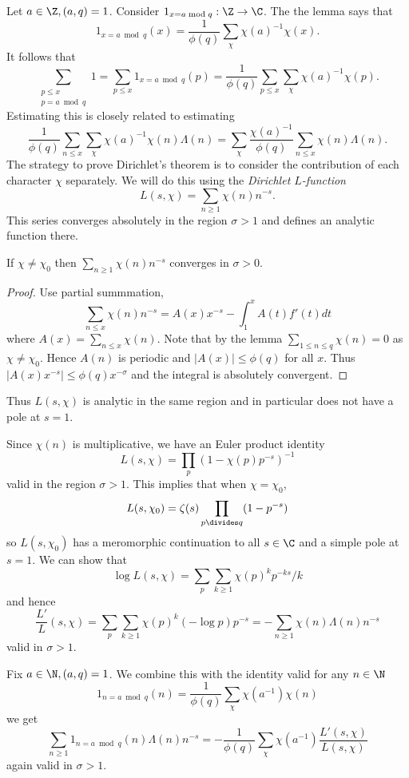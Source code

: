 \documentclass[a4paper]{article}
\theoremstyle{definition}
\begin{document}
Let \(a \in \Z, (a, q) = 1\). Consider \(1_{x = a \bmod q}: \Z \to \C\). The the lemma says that
\[
  1_{x = a \bmod q} (x) = \frac{1}{\phi(q)} \sum_\chi \chi(a)^{-1} \chi(x).
\]
It follows that
\[
  \sum_{\substack{p \leq x \\ p = a \bmod q}} 1
  = \sum_{p \leq x} 1_{x = a \bmod q}(p)
  = \frac{1}{\phi(q)} \sum_{p \leq x} \sum_\chi \chi(a)^{-1} \chi(p).
\]
Estimating this is closely related to estimating 
\[
  \frac{1}{\phi(q)} \sum_{n \leq x} \sum_\chi \chi(a)^{-1} \chi(n) \Lambda(n)
  = \sum_\chi \frac{\chi(a)^{-1}}{\phi(q)} \sum_{n \leq x} \chi(n) \Lambda(n).
\]
The strategy to prove Dirichlet's theorem is to consider the contribution of each character \(\chi\) separately. We will do this using the \emph{Dirichlet \(L\)-function}
\[
  L(s, \chi) = \sum_{n \geq 1} \chi(n) n^{-s}.
\]
This series converges absolutely in the region \(\sigma > 1\) and defines an analytic function there.

\begin{lemma}
  If \(\chi \neq \chi_0\) then \(\sum_{n \geq 1} \chi(n) n^{-s}\) converges in \(\sigma > 0\).
\end{lemma}

\begin{proof}
  Use partial summmation,
  \[
    \sum_{n \leq x} \chi(n) n^{-s} = A(x) x^{-s} - \int_1^x A(t) f'(t) dt
  \]
  where \(A(x) = \sum_{n \leq x} \chi(n)\). Note that by the lemma \(\sum_{1 \leq n \leq q} \chi(n) = 0\) as \(\chi \neq \chi_0\). Hence \(A(n)\) is periodic and \(|A(x)| \leq \phi(q)\) for all \(x\). Thus \(|A(x)x^{-s}| \leq \phi(q) x^{-\sigma}\) and the integral is absolutely convergent.
\end{proof}
Thus \(L(s, \chi)\) is analytic in the same region and in particular does not have a pole at \(s = 1\).

Since \(\chi(n)\) is multiplicative, we have an Euler product identity
\[
  L(s, \chi) = \prod_p (1 - \chi(p) p^{-s})^{-1}
\]
valid in the region \(\sigma > 1\). This implies that when \(\chi = \chi_0\),
\[
  L(s, \chi_0) = \zeta(s) \prod_{p \divides q} (1 - p^{-s})
\]
so \(L(s, \chi_0)\) has a meromorphic continuation to all \(s \in \C\) and a simple pole at \(s = 1\). We can show that
\[
  \log L(s, \chi) = \sum_p \sum_{k \geq 1} \chi(p)^k p^{-ks}/k
\]
and hence
\[
  \frac{L'}{L}(s, \chi)
  = \sum_p \sum_{k \geq 1} \chi(p)^k (-\log p) p^{-s}
  = -\sum_{n \geq 1} \chi(n) \Lambda(n) n^{-s}
\]
valid in \(\sigma > 1\).

Fix \(a \in \N, (a, q) = 1\). We combine this with the identity valid for any \(n \in \N\)
\[
  1_{n = a \bmod q} (n) = \frac{1}{\phi(q)} \sum_\chi \chi(a^{-1})\chi(n)
\]
we get
\[
  \sum_{n \geq 1} 1_{n = a \bmod q}(n)  \Lambda(n)n^{-s}
  = - \frac{1}{\phi(q)} \sum_\chi \chi(a^{-1}) \frac{L'(s, \chi)}{L(s, \chi)}
\]
again valid in \(\sigma > 1\).
\end{document}
